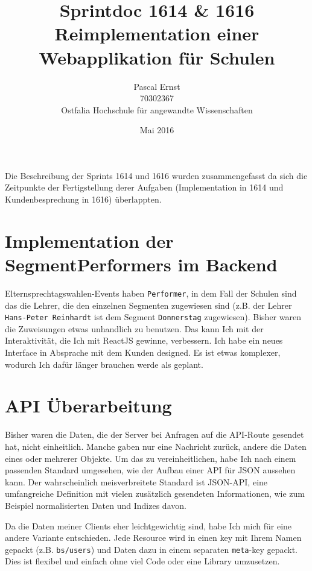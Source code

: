 \documentclass[a4paper,10pt]{scrartcl}
\begin{document}
\title{Sprintdoc 1614 \& 1616 \\
  Reimplementation einer Webapplikation für Schulen}
\author{Pascal Ernst\\
  70302367 \\
  Ostfalia Hochschule für angewandte Wissenschaften}
\date{Mai 2016}
\maketitle

\newpage

Die Beschreibung der Sprints 1614 und 1616 wurden zusammengefasst da sich die
Zeitpunkte der Fertigstellung derer Aufgaben (Implementation in 1614 und
Kundenbesprechung in 1616) überlappten.

\section{Implementation der SegmentPerformers im Backend}

  Elternsprechtagswahlen-Events haben \lstinline{Performer}, in dem Fall der
  Schulen sind das die Lehrer, die den einzelnen Segmenten zugewiesen sind
  (z.B. der Lehrer \newline \lstinline{Hans-Peter Reinhardt} ist dem Segment
  \lstinline{Donnerstag} zugewiesen).
  Bisher waren die Zuweisungen etwas unhandlich zu benutzen.
  Das kann Ich mit der Interaktivität, die Ich mit ReactJS gewinne, verbessern.
  Ich habe ein neues Interface in Absprache mit dem Kunden designed.
  Es ist etwas komplexer, wodurch Ich dafür länger brauchen werde als geplant.

\section{API Überarbeitung}

  Bisher waren die Daten, die der Server bei Anfragen auf die API-Route gesendet
  hat, nicht einheitlich.
  Manche gaben nur eine Nachricht zurück, andere die Daten eines oder mehrerer
  Objekte.
  Um das zu vereinheitlichen, habe Ich nach einem passenden Standard umgesehen,
  wie der Aufbau einer API für JSON aussehen kann.
  Der wahrscheinlich meisverbreitete Standard ist JSON-API, eine umfangreiche
  Definition mit vielen zusätzlich gesendeten Informationen, wie zum Beispiel
  normalisierten Daten und Indizes davon.

  Da die Daten meiner Clients eher leichtgewichtig sind, habe Ich mich für eine
  andere Variante entschieden.
  Jede Resource wird in einen key mit Ihrem Namen gepackt (z.B.
  \lstinline{bs/users}) und Daten dazu in einem separaten \lstinline{meta}-key
  gepackt.
  Dies ist flexibel und einfach ohne viel Code oder eine Library umzusetzen.
\end{document}
